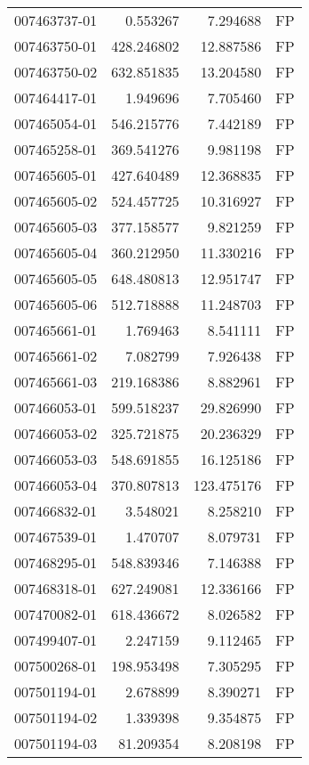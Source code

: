 \begin{tabular}{lrrl}
007463737-01 &    0.553267 &     7.294688 &   FP \\
007463750-01 &  428.246802 &    12.887586 &   FP \\
007463750-02 &  632.851835 &    13.204580 &   FP \\
007464417-01 &    1.949696 &     7.705460 &   FP \\
007465054-01 &  546.215776 &     7.442189 &   FP \\
007465258-01 &  369.541276 &     9.981198 &   FP \\
007465605-01 &  427.640489 &    12.368835 &   FP \\
007465605-02 &  524.457725 &    10.316927 &   FP \\
007465605-03 &  377.158577 &     9.821259 &   FP \\
007465605-04 &  360.212950 &    11.330216 &   FP \\
007465605-05 &  648.480813 &    12.951747 &   FP \\
007465605-06 &  512.718888 &    11.248703 &   FP \\
007465661-01 &    1.769463 &     8.541111 &   FP \\
007465661-02 &    7.082799 &     7.926438 &   FP \\
007465661-03 &  219.168386 &     8.882961 &   FP \\
007466053-01 &  599.518237 &    29.826990 &   FP \\
007466053-02 &  325.721875 &    20.236329 &   FP \\
007466053-03 &  548.691855 &    16.125186 &   FP \\
007466053-04 &  370.807813 &   123.475176 &   FP \\
007466832-01 &    3.548021 &     8.258210 &   FP \\
007467539-01 &    1.470707 &     8.079731 &   FP \\
007468295-01 &  548.839346 &     7.146388 &   FP \\
007468318-01 &  627.249081 &    12.336166 &   FP \\
007470082-01 &  618.436672 &     8.026582 &   FP \\
007499407-01 &    2.247159 &     9.112465 &   FP \\
007500268-01 &  198.953498 &     7.305295 &   FP \\
007501194-01 &    2.678899 &     8.390271 &   FP \\
007501194-02 &    1.339398 &     9.354875 &   FP \\
007501194-03 &   81.209354 &     8.208198 &   FP \\

\end{tabular}
